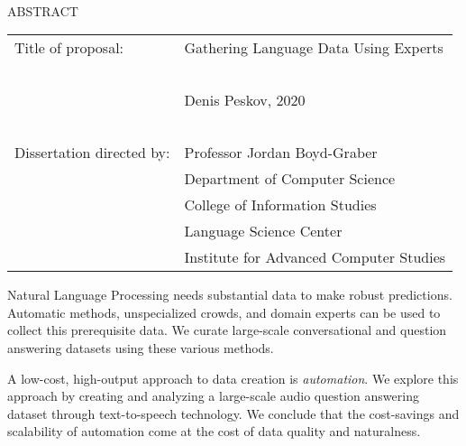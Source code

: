 
\hbox{\ }

\renewcommand{\baselinestretch}{1}
\small \normalsize

\begin{center}
    \large{{ABSTRACT}}
    
    \vspace{3em}
    
\end{center}
\hspace{-.15in}
\begin{tabular}{ll}
    Title of proposal: & {\large  Gathering Language Data Using Experts}     \\
    \                                                                      \\
                       & {\large  Denis Peskov, 2020}                   \\
    \                                                                      \\
    Dissertation directed by:
                       & {\large  Professor Jordan Boyd-Graber}            \\
                       & {\large  Department of Computer Science}          \\
                       & {\large  College of Information Studies}          \\
                       & {\large  Language Science Center}                 \\
                       & {\large  Institute for Advanced Computer Studies} \\
\end{tabular}

\vspace{3em}

\renewcommand{\baselinestretch}{2}
\large \normalsize


Natural Language Processing needs substantial data to make robust predictions. 
%
Automatic methods, unspecialized crowds, and domain experts can be used to collect this prerequisite data.
%
We curate large-scale conversational and question answering  datasets using these various methods. 


A low-cost, high-output approach to data creation is \textit{automation}.  
%
We explore this approach by creating and analyzing a large-scale audio question answering dataset through text-to-speech technology.  
%
%
We conclude that the cost-savings and scalability of automation come at the cost of data quality and naturalness.  

